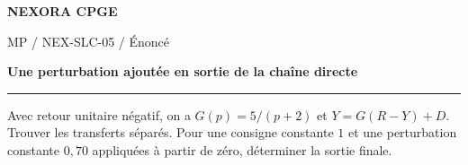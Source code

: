 \documentclass[11pt,a4paper]{article}
\begin{document}
{\small\bfseries\color{nexorablue} NEXORA CPGE}\par
{\small MP / NEX-SLC-05 / Énoncé}\par
{\LARGE\bfseries Une perturbation ajoutée en sortie de la chaîne directe}\par
\vspace{0.25em}\hrule\vspace{0.6em}

Avec retour unitaire négatif, on a $G(p)=5/(p+2)$ et $Y=G(R-Y)+D$. Trouver les transferts séparés. Pour une consigne constante $1$ et une perturbation constante $0{,}70$ appliquées à partir de zéro, déterminer la sortie finale.
\end{document}
